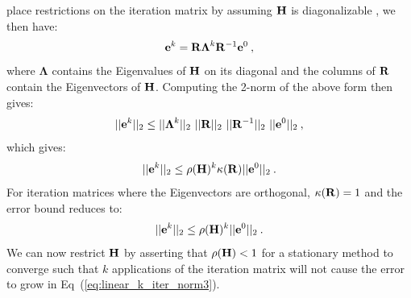 \documentclass{mc2013}
\begin{document}
place restrictions on the iteration matrix by assuming $\mathbf{H}$ is
diagonalizable \cite{saad_iterative_2003}, we then have:
\begin{equation}
  \mathbf{e}^{k} =
  \mathbf{R}\boldsymbol{\Lambda}^k\mathbf{R}^{-1}\mathbf{e}^0\:,
  \label{eq:linear_k_iter_error_diag}
\end{equation}
where $\boldsymbol{\Lambda}$ contains the Eigenvalues of $\mathbf{H}$ on
its diagonal and the columns of $\mathbf{R}$ contain the Eigenvectors of
$\mathbf{H}$. Computing the 2-norm of the above form then gives:
\begin{equation}
  ||\ve{e}^{k}||_2 \leq ||\boldsymbol{\Lambda}^k||_2\ 
  ||\ve{R}||_2\ ||\ve{R}^{-1}||_2\ ||\ve{e}^0||_2\:,
  \label{eq:linear_k_iter_norm1}
\end{equation}
which gives:
\begin{equation}
  ||\mathbf{e}^{k}||_2 \leq \rho(\mathbf{H})^k \kappa(\mathbf{R})
  ||\mathbf{e}^0||_2\:.
  \label{eq:linear_k_iter_norm2}
\end{equation}
For iteration matrices where the Eigenvectors are orthogonal,
$\kappa(\mathbf{R})=1$ and the error bound reduces to:
\begin{equation}
  ||\mathbf{e}^{k}||_2 \leq \rho(\mathbf{H})^k ||\mathbf{e}^0||_2\:.
  \label{eq:linear_k_iter_norm3}
\end{equation}
We can now restrict $\mathbf{H}$ by asserting that $\rho(\mathbf{H}) < 1$
for a stationary method to converge such that $k$ applications of the
iteration matrix will not cause the error to grow in
Eq~(\ref{eq:linear_k_iter_norm3}). 
\end{document}
